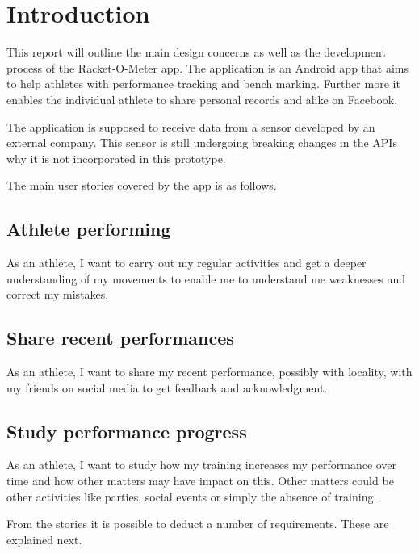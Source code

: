 \chapter{Introduction}
This report will outline the main design concerns as well as the development process of the Racket-O-Meter app. The application is an Android app that aims to help athletes with performance tracking and bench marking. Further more it enables the individual athlete to share personal records and alike on Facebook.

The application is supposed to receive data from a sensor developed by an external company. This sensor is still undergoing breaking changes in the APIs why it is not incorporated in this prototype.

The main user stories covered by the app is as follows.

\section*{Athlete performing}
As an athlete, I want to carry out my regular activities and get a deeper understanding of my movements to enable me to understand me weaknesses and correct my mistakes.

\section*{Share recent performances}
As an athlete, I want to share my recent performance, possibly with locality, with my friends on social media to get feedback and acknowledgment.

\section*{Study performance progress}
As an athlete, I want to study how my training increases my performance over time and how other matters may have impact on this.
Other matters could be other activities like parties, social events or simply the absence of training.

From the stories it is possible to deduct a number of requirements. These are explained next.
